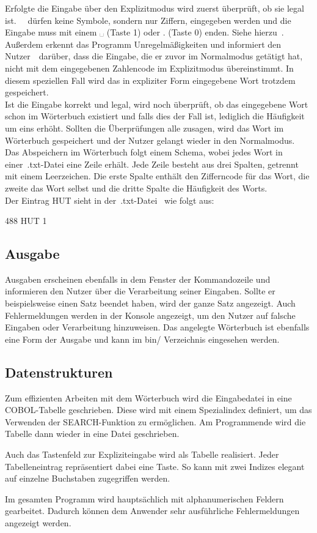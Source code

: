 Erfolgte die Eingabe über den Explizitmodus wird zuerst überprüft, ob sie legal ist.
~\ZB~dürfen keine Symbole, sondern nur Ziffern, eingegeben werden und die Eingabe muss mit einem ␣ (Taste 1) oder . (Taste 0) enden.
Siehe hierzu~.\\
Außerdem erkennt das Programm Unregelmäßigkeiten und informiert den Nutzer~\zB~darüber, dass die Eingabe, die er zuvor im Normalmodus getätigt hat, nicht mit dem eingegebenen Zahlencode im Explizitmodus übereinstimmt.
In diesem speziellen Fall wird das in expliziter Form eingegebene Wort trotzdem gespeichert.\\
Ist die Eingabe korrekt und legal, wird noch überprüft, ob das eingegebene Wort schon im Wörterbuch existiert und falls dies der Fall ist, lediglich die Häufigkeit um eins erhöht.
Sollten die Überprüfungen alle zusagen, wird das Wort im Wörterbuch gespeichert und der Nutzer gelangt wieder in den Normalmodus.\\
Das Abspeichern im Wörterbuch folgt einem Schema, wobei jedes Wort in einer~.txt-Datei eine Zeile erhält.
Jede Zeile besteht aus drei Spalten, getrennt mit einem Leerzeichen.
Die erste Spalte enthält den Zifferncode für das Wort, die zweite das Wort selbst und die dritte Spalte die Häufigkeit des Worts.\\
Der Eintrag HUT sieht in der~.txt-Datei \zB~wie folgt aus:\\

\begin{centering}
    488 HUT 1\\
\end{centering}

\subsection{Ausgabe}\label{subsec:ausgabe}
Ausgaben erscheinen ebenfalls in dem Fenster der Kommandozeile und informieren den Nutzer über die Verarbeitung seiner Eingaben.
Sollte er beispielsweise einen Satz beendet haben, wird der ganze Satz angezeigt.
Auch Fehlermeldungen werden in der Konsole angezeigt, um den Nutzer auf falsche Eingaben oder Verarbeitung hinzuweisen.
Das angelegte Wörterbuch ist ebenfalls eine Form der Ausgabe und kann im bin/ Verzeichnis eingesehen werden.

\subsection{Datenstrukturen}\label{subsec:datenstrukt}
Zum effizienten Arbeiten mit dem Wörterbuch wird die Eingabedatei in eine COBOL-Tabelle geschrieben.
Diese wird mit einem Spezialindex definiert, um das Verwenden der \glqq SEARCH\grqq{}-Funktion zu ermöglichen.
Am Programmende wird die Tabelle dann wieder in eine Datei geschrieben.

Auch das Tastenfeld zur Expliziteingabe wird als Tabelle realisiert.
Jeder Tabelleneintrag repräsentiert dabei eine Taste.
So kann mit zwei Indizes elegant auf einzelne Buchstaben zugegriffen werden.

Im gesamten Programm wird hauptsächlich mit alphanumerischen Feldern gearbeitet.
Dadurch können dem Anwender sehr ausführliche Fehlermeldungen angezeigt werden.

